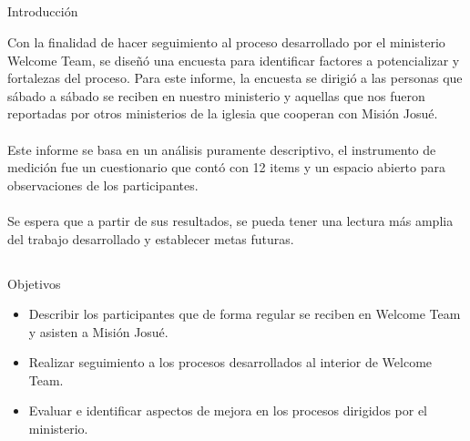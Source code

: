 \documentclass{beamer}
\begin{document}
\begin{frame}
    \maketitle  
\end{frame}

\subsection{}
\begin{frame}{Introducción}
\vspace{-0.9\baselineskip}
\begin{tcolorbox}[colback=backframe_color,colframe=beamer_color] 
Con la finalidad de hacer seguimiento al proceso desarrollado por el ministerio Welcome Team, se diseñó una encuesta para identificar factores a potencializar y fortalezas del proceso.
Para este informe, la encuesta se dirigió a las personas que sábado a sábado se reciben en nuestro ministerio y aquellas que nos fueron reportadas por otros ministerios de la iglesia que cooperan con Misión Josué.
\\\\
Este informe se basa en un análisis puramente descriptivo, el instrumento de medición fue un cuestionario que contó con 12 items y un espacio abierto para observaciones de los participantes.
\\\\
Se espera que a partir de sus resultados, se pueda tener una lectura más amplia del trabajo desarrollado y establecer metas futuras.

\end{tcolorbox}
\end{frame}





\subsection{}
\begin{frame}{Objetivos}
\vspace{-0.9\baselineskip}
\begin{tcolorbox}[colback=backframe_color,colframe=beamer_color,title= ] 
\begin{itemize}
    \item Describir los participantes que de forma regular se reciben en Welcome Team y asisten a Misión Josué.
    \item Realizar seguimiento a los procesos desarrollados al interior de Welcome Team.
    \item Evaluar e identificar aspectos de mejora en los procesos dirigidos por el ministerio.
\end{itemize}


\end{tcolorbox}
\end{frame}
\end{document}
